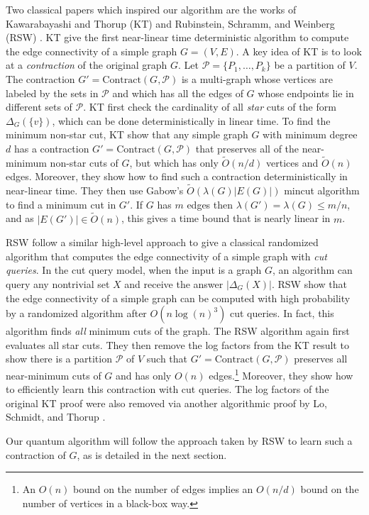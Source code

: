 \documentclass[10pt,a4paper]{article}
\newcommand{\Pcal}{\mathcal{P}}
\newcommand{\Contract}{\mathrm{Contract}}
\newcommand{\tO}{\tilde O}
\newcommand{\1}{\mathbf{1}}
\theoremstyle{definition}
\begin{document}
Two classical papers which inspired our algorithm are the works of Kawarabayashi and Thorup (KT) \cite{KT19} and Rubinstein, Schramm, and Weinberg (RSW) \cite{RSW18}.  
KT give the first near-linear time deterministic algorithm to compute the edge connectivity of a simple graph $G = (V,E)$.  A key idea of KT is to look at a \emph{contraction} of the original graph $G$.  Let 
$\Pcal = \{P_1, \ldots, P_k\}$ be a partition of $V$.  The contraction $G' = \Contract(G,\Pcal)$ is a multi-graph whose vertices are labeled by the sets in $\Pcal$ 
and which has all the edges of $G$ whose endpoints lie in different sets of $\Pcal$.  KT first check the cardinality of all \emph{star} cuts of the form $\Delta_G(\{v\})$, which can be 
done deterministically in linear time.  
To find the minimum non-star cut, KT show that any simple graph $G$ with minimum degree $d$ has a contraction $G'= \Contract(G,\Pcal)$ that 
preserves all of the near-minimum non-star cuts of $G$, but which has only $\tO(n/d)$ vertices and $\tO(n)$ edges.  Moreover, they 
show how to find such a contraction deterministically in near-linear time.  They then use Gabow's $\tilde O(\lambda(G)|E(G)|)$ mincut algorithm \cite{Gabow95} to find a minimum cut in $G'$.
If $G$ has $m$ edges then $\lambda(G') =\lambda(G) \leq m/n$, and as $|E(G')| \in \tilde O(n)$, this gives a time bound that is nearly linear in $m$.

RSW follow a similar high-level approach to give a classical randomized algorithm that computes the edge connectivity of a simple graph with
\emph{cut queries}.  In the cut query model, when the input is a graph $G$, an algorithm can query any nontrivial set $X$ and receive the answer $|\Delta_G(X)|$.  
RSW show that the edge connectivity of a simple graph can be computed with high probability by a randomized algorithm after $O(n \log(n)^3)$ cut queries.  
In fact, this algorithm finds \emph{all} minimum cuts of the graph.  The RSW algorithm again first evaluates all star cuts.
They then
remove the log factors from the KT result to show there is a partition $\Pcal$ of $V$ such that $G' = \Contract(G,\Pcal)$ preserves all 
near-minimum cuts of $G$ and has only $O(n)$ edges.\footnote{An $O(n)$ bound on the number of edges implies an $O(n/d)$ bound on the number of vertices in a black-box way.} 
Moreover, they show how to efficiently learn this contraction with cut queries.  
The log factors of the original KT proof were also removed via another algorithmic proof by Lo, Schmidt, and Thorup \cite{LST20}.  

Our quantum algorithm will follow the approach taken by RSW to learn such a contraction of $G$, as is detailed in the next section.
\end{document}
